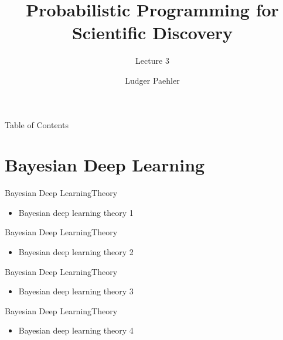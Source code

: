 \documentclass[AERbeamer%
              ,optEnglish%
              ,optBiber%
              ,optBibstyleAlphabetic%
              ,optBeamerClassicFormat%
              ]{AERlatex}%
\title{Probabilistic Programming for Scientific Discovery}%
\subtitle{Lecture 3}
\author{Ludger Paehler}%
\date{\AERutilsDate{29}{7}{2020}}%
\institute{Lviv Data Science Summer School}%
\begin{document}
%
%
\AERbeamerTitlePageDefault%
%
%

\begin{frame}{Table of Contents}{}%
    \tableofcontents
\end{frame}%



\section{Bayesian Deep Learning}

\begin{frame}[c]{Bayesian Deep Learning}{Theory}
    \centering
    \begin{itemize}
        \item Bayesian deep learning theory 1
    \end{itemize}
\end{frame}


\begin{frame}[c]{Bayesian Deep Learning}{Theory}
    \centering
    \begin{itemize}
        \item Bayesian deep learning theory 2
    \end{itemize}
\end{frame}


\begin{frame}[c]{Bayesian Deep Learning}{Theory}
    \centering
    \begin{itemize}
        \item Bayesian deep learning theory 3
    \end{itemize}
\end{frame}


\begin{frame}[c]{Bayesian Deep Learning}{Theory}
    \centering
    \begin{itemize}
        \item Bayesian deep learning theory 4
    \end{itemize}
\end{frame}
\end{document}
